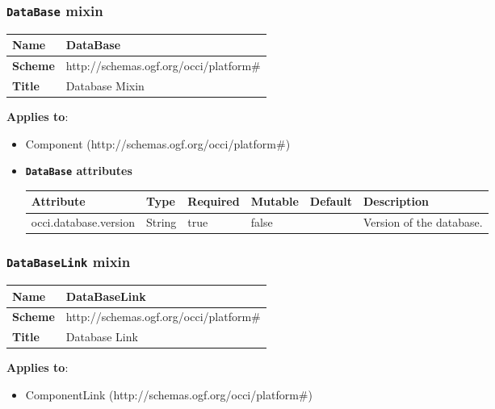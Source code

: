 \subsubsection{\texttt{DataBase} mixin}
\begin{center}
\begin{tabular}{|l|l|}
  \hline
  \textbf{Name} & DataBase \\
  \hline  
  \textbf{Scheme} & http://schemas.ogf.org/occi/platform\# \\
  \hline
  \textbf{Title} & Database Mixin \\
  \hline
\end{tabular}
\end{center}
\textbf{Applies to}:
\begin{itemize}
	\item Component (http://schemas.ogf.org/occi/platform\#)
\end{itemize}

\begin{itemize}
\item \textbf{\texttt{DataBase} attributes}

\begin{tabularx}{\textwidth}{|l|l|p{1.4cm}|p{1.3cm}|l|X|}
  \hline
  \textbf{Attribute} & \textbf{Type} & \textbf{Required} & \textbf{Mutable} & \textbf{Default} & \textbf{Description} \\
  \hline  
  occi.database.version & String & true & false &  & Version of the database. \\
  \hline
\end{tabularx}
\end{itemize}


\subsubsection{\texttt{DataBaseLink} mixin}
\begin{center}
\begin{tabular}{|l|l|}
  \hline
  \textbf{Name} & DataBaseLink \\
  \hline  
  \textbf{Scheme} & http://schemas.ogf.org/occi/platform\# \\
  \hline
  \textbf{Title} & Database Link \\
  \hline
\end{tabular}
\end{center}
\textbf{Applies to}:
\begin{itemize}
	\item ComponentLink (http://schemas.ogf.org/occi/platform\#)
\end{itemize}

